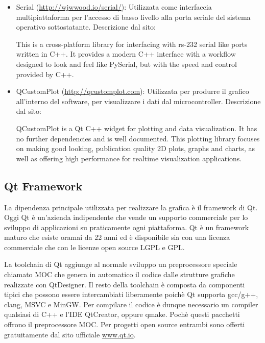 \begin{itemize}
    \item Serial (\url{http://wjwwood.io/serial/}): Utilizzata come
        interfaccia multipiattaforma per l'accesso di basso livello alla porta
        seriale del sistema operativo sottostatante. Descrizione dal sito:
        \begin{displayquote}
            This is a cross-platform library for interfacing with rs-232
            serial like ports written in C++. It provides a modern C++
            interface with a workflow designed to look and feel like PySerial,
            but with the speed and control provided by C++. 
        \end{displayquote}

    \item QCustomPlot (\url{http://qcustomplot.com}): Utilizzata per produrre
        il grafico all'interno del software, per visualizzare i dati dal
        microcontroller. Descrizione dal sito:
        \begin{displayquote}
            QCustomPlot is a Qt C++ widget for plotting and data
            visualization. It has no further dependencies and is well
            documented. This plotting library focuses on making good looking,
            publication quality 2D plots, graphs and charts, as well as
            offering high performance for realtime visualization applications. 
        \end{displayquote}
\end{itemize}

\subsection{Qt Framework}
La dipendenza principale utilizzata per realizzare la grafica \`e il framework
di Qt. Oggi Qt \`e un'azienda indipendente che vende un supporto commerciale
per lo sviluppo di applicazioni su praticamente ogni piattaforma.
Qt \`e un framework maturo che esiste oramai da 22 anni ed \`e disponibile sia
con una licenza commerciale che con le licenze open source LGPL e GPL.

La toolchain di Qt aggiunge al normale sviluppo un preprocessore speciale
chiamato MOC che genera in automatico il codice dalle strutture grafiche
realizzate con QtDesigner. Il resto della toolchain \`e composta da componenti
tipici che possono essere intercambiati liberamente poich\`e Qt supporta
gcc/g++, clang, MSVC e MinGW. Per compilare il codice \`e dunque necessario un
compiler qualsiasi di C++ e l'IDE QtCreator, oppure qmake. Poch\`e questi
pacchetti offrono il preprocessore MOC. Per progetti open source entrambi sono
offerti gratuitamente dal sito ufficiale \url{www.qt.io}.

